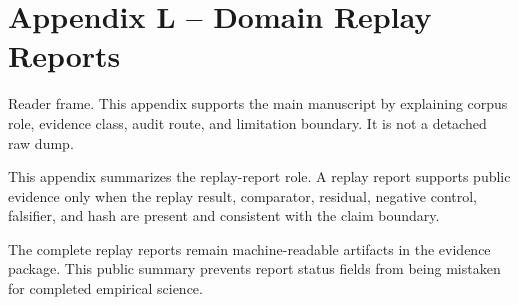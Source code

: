 \section{Appendix L -- Domain Replay Reports}
Reader frame. This appendix supports the main manuscript by explaining corpus role, evidence class, audit route, and limitation boundary. It is not a detached raw dump.


\label{sec:oc-core-1-3-domain-replay-report-summary}

This appendix summarizes the replay-report role. A replay report supports public evidence only when the replay result, comparator, residual, negative control, falsifier, and hash are present and consistent with the claim boundary.


The complete replay reports remain machine-readable artifacts in the evidence package. This public summary prevents report status fields from being mistaken for completed empirical science.
